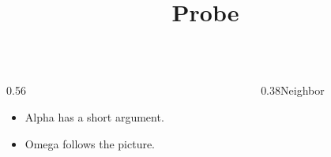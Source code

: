 \documentclass[20pt,aspectratio=169]{beamer}
\title{Probe}
\date{}
\begin{document}
\begin{frame}\begin{columns}[onlytextwidth,t]\begin{column}{0.56\textwidth}\begin{itemize}\item Alpha has a short argument.\par {}\item Omega follows the picture.\end{itemize}\end{column}\begin{column}{0.38\textwidth}Neighbor\end{column}\end{columns}\end{frame}
\end{document}
